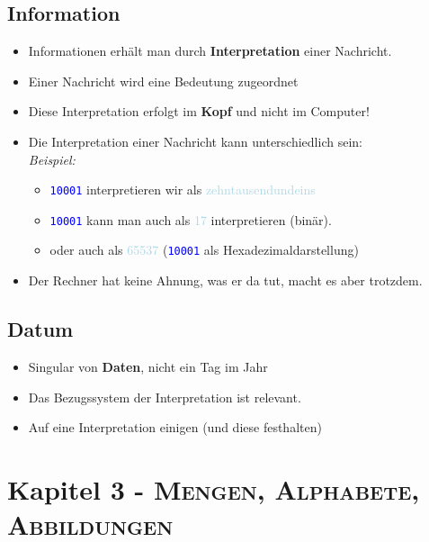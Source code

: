 \documentclass{article}
\newcommand{\kapitel}[2]{Kapitel #1 - \textsc{#2}}
\newcommand{\blue}[1]{\textcolor{blue}{#1}}
\newcommand{\babyblue}[1]{\textcolor{lightblue}{#1}}
\newcommand{\strongColor}[1]{\textcolor{strongColor}{#1}}
\newcommand{\strong}[1]{\textbf{\strongColor{#1}}}
\newcommand{\important}[1]{\textcolor{importantColor}{#1}}
\newcommand{\example}[1]{\textit{Beispiel: }#1}
\newcommand{\word}[1]{\blue{\texttt{#1}}}
\newcommand{\interpretation}[1]{\babyblue{#1}}
\begin{document}
\subsection{Information}
\begin{itemize}
    \item Informationen erhält man durch \strong{Interpretation} einer Nachricht.
    \item Einer Nachricht wird eine Bedeutung zugeordnet
    \item Diese Interpretation erfolgt im \strong{Kopf} und nicht im Computer!
    \item Die Interpretation einer Nachricht kann unterschiedlich sein:\\\example
    \begin{itemize}
        \item \word{10001} interpretieren wir als \interpretation{zehntausendundeins}
        \item \word{10001} kann man auch als \interpretation{17} interpretieren (binär).
        \item oder auch als \interpretation{65537} (\word{10001} als Hexadezimaldarstellung)
    \end{itemize}
    \item Der Rechner hat \dq keine Ahnung\dq{}, was er da tut, macht es aber trotzdem.
\end{itemize}

\subsection{Datum}
\begin{itemize}
    \item Singular von \strong{Daten}, nicht ein Tag im Jahr
    \item Das Bezugssystem der Interpretation ist relevant.
    \item \important{Auf eine Interpretation einigen (und diese festhalten)}
\end{itemize}

\newpage
\section{\kapitel{3}{Mengen, Alphabete, Abbildungen}}
\end{document}
